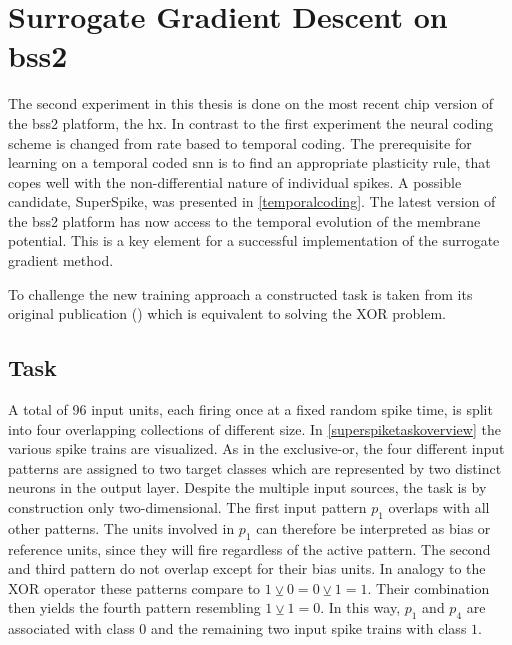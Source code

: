 \chapter{Surrogate Gradient Descent on \acrshort{bss2}}
\label{superspike}
The second experiment in this thesis is done on the most recent chip version of the \gls{bss2} platform, the \gls{hx}. In contrast to the first experiment the neural coding scheme is changed from rate based to temporal coding. The prerequisite for learning on a temporal coded \gls{snn} is to find an appropriate plasticity rule, that copes well with the non-differential nature of individual spikes. A possible candidate, SuperSpike, was presented in \cref{temporalcoding}. The latest version of the \gls{bss2} platform has now access to the temporal evolution of the membrane potential. This is a key element for a successful implementation of the surrogate gradient method.

To challenge the new training approach a constructed task is taken from its original publication (\citealp{zenke2018superspike}) which is equivalent to solving the XOR problem.

\section{Task}
A total of 96 input units, each firing once at a fixed random spike time, is split into four overlapping collections of different size. In \cref{superspiketaskoverview} the various spike trains are visualized. As in the exclusive-or, the four different input patterns are assigned to two target classes which are represented by two distinct neurons in the output layer. Despite the multiple input sources, the task is by construction only two-dimensional. The first input pattern $p_1$ overlaps with all other patterns. The units involved in $p_1$ can therefore be interpreted as bias or reference units, since they will fire regardless of the active pattern. The second and third pattern do not overlap except for their bias units. In analogy to the XOR operator these patterns compare to $1 \veebar 0 = 0 \veebar 1 = 1$. Their combination then yields the fourth pattern resembling $1 \veebar 1 = 0$. In this way, $p_1$ and $p_4$ are associated with class $0$ and the remaining two input spike trains with class $1$. 

